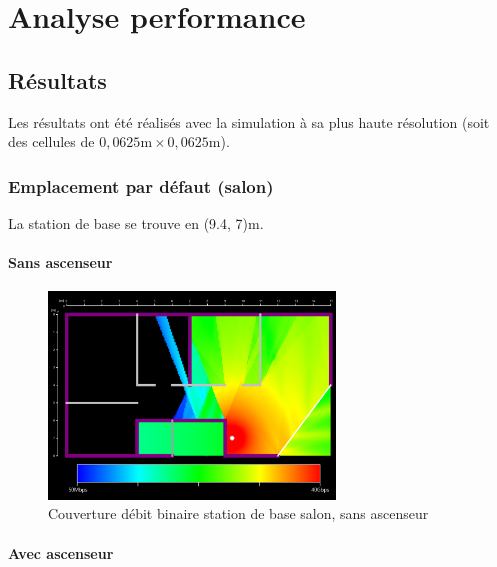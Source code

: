 \chapter{Analyse performance}
\label{chapter-4}




\section{Résultats}

Les résultats ont été réalisés avec la simulation à sa plus haute résolution (soit des cellules de $0,0625\mathrm{m}\times0,0625\mathrm{m}$).

\subsection{Emplacement par défaut (salon)}
La station de base se trouve en (9.4, 7)m.

\subsubsection{Sans ascenseur}

\begin{figure}[H]
    \centering
    \includegraphics[width=0.68\textwidth]{latex/images/highres-without-lift.png}
    \caption{Couverture débit binaire station de base salon, sans ascenseur}
    \label{fig:simu-emplacement-defaut-sansasc}
\end{figure}

\subsubsection{Avec ascenseur}

